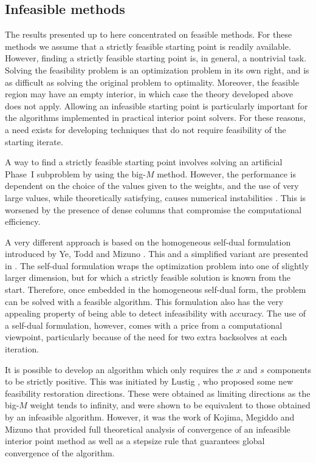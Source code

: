 %
%
\subsection{Infeasible methods}
\label{sec:InfeasibleMethods}

The results presented up to here concentrated on feasible methods. 
For these methods we assume that a strictly feasible starting point is
readily available.
However, finding a strictly feasible starting point is, 
in general, a nontrivial task.
Solving the feasibility problem is an optimization problem in its
own right, and is as difficult as solving the original problem
to optimality.
Moreover, the feasible region may have an empty interior,
in which case the theory developed above does not apply.
Allowing an infeasible starting point is particularly important
for the algorithms implemented in practical interior point solvers.
For these reasons, a need exists for developing techniques
that do not require feasibility of the 
starting iterate.

A way to find a strictly feasible starting point involves 
solving an artificial Phase~I subproblem by using 
the big-$M$ method. However, the performance is dependent on 
the choice of the values given to the weights, and the use
of very large values, while theoretically satisfying,
causes numerical instabilities \cite{Lustig91}.
This is worsened 
by the presence of dense columns that compromise the 
computational efficiency. 

A very different approach is based on the homogeneous 
self-dual formulation introduced by Ye, Todd and Mizuno
\cite{YeToddMizuno94}.
This and a simplified variant are presented in \cite[Chapter~9]{ipm:Wright97}.
The self-dual formulation wraps the optimization problem into one 
of slightly larger dimension, but for which a strictly feasible solution
is known from the start.
Therefore, once embedded in the homogeneous self-dual form,
the problem can be solved with a feasible algorithm.
This formulation also has the very
appealing property of being able to detect infeasibility
with accuracy.
The use of a self-dual formulation, however, comes with a price from a
computational viewpoint, particularly because of the need for
two extra backsolves at each iteration.

It is possible to develop an algorithm which only requires 
the $x$ and $s$ components to be strictly positive. 
This was initiated by Lustig \cite{Lustig91}, who proposed some
new feasibility restoration directions.
These were obtained as limiting directions as the big-$M$
weight tends to infinity, and were shown to be equivalent
to those obtained by an infeasible algorithm.
However, it was the work of Kojima, Megiddo and Mizuno 
\cite{KojimaMegiddoMizuno}
that provided full theoretical analysis of convergence of
an infeasible interior point method as well as
a stepsize rule that guarantees global convergence of the algorithm.

